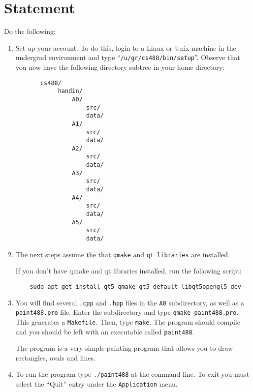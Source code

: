 \section{Statement}
Do the following:
\begin{enumerate}
    \item
        Set up your account.  To do this, login to a Linux or Unix
        machine in the undergrad environment
        and type ``\texttt{/u/gr/cs488/bin/setup}''.
        Observe that you now have
        the following directory subtree in your home directory:
        \begin{verbatim}
       cs488/
            handin/
                A0/
                    src/
                    data/
                A1/
                    src/
                    data/
                A2/
                    src/
                    data/
                A3/
                    src/
                    data/
                A4/
                    src/
                    data/
                A5/
                    src/
                    data/
        \end{verbatim}
        \item 
            The next steps assume the that \texttt{qmake} and \texttt{qt
            libraries} are installed.

            If you don't have qmake and qt libraries installed, run the following
            script:
            \begin{verbatim}
    sudo apt-get install qt5-qmake qt5-default libqt5opengl5-dev
            \end{verbatim} 
        \item
                You will find several \texttt{.cpp} and \texttt{.hpp}
                files in the \texttt{A0} subdirectory, as well as a
                \texttt{paint488.pro} file. Enter the subdirectory and type 
                \texttt{qmake paint488.pro}. This generates a 
                \texttt{Makefile}. Then, type \texttt{make}. The program 
                should compile and you should be left with an executable called
                \texttt{paint488}.

                The program is a very simple painting program that
                allows you to draw rectangles, ovals and lines.

        \item
                To run the program type \texttt{./paint488} at the
                command line.  To exit you must select
                the ``Quit'' entry under the \texttt{Application} menu.


\end{enumerate}
